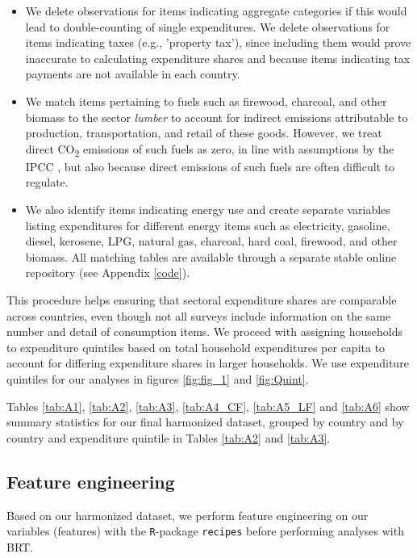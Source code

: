 \documentclass[12pt, a4paper]{article}
\begin{document}
\begin{refsection}
\begin{itemize}
    \item We delete observations for items indicating aggregate categories if this would lead to double-counting of single expenditures. We delete observations for items indicating taxes (e.g., 'property tax'), since including them would prove inaccurate to calculating expenditure shares and because items indicating tax payments are not available in each country.
    \item We match items pertaining to fuels such as firewood, charcoal, and other biomass to the sector \textit{lumber} to account for indirect emissions attributable to production, transportation, and retail of these goods. However, we treat direct CO\textsubscript{2} emissions of such fuels as zero, in line with assumptions by the IPCC \autocite{Grad.2023}, but also because direct emissions of such fuels are often difficult to regulate.
    \item We also identify items indicating energy use and create separate variables listing expenditures for different energy items such as electricity, gasoline, diesel, kerosene, LPG, natural gas, charcoal, hard coal, firewood, and other biomass. All matching tables are available through a separate stable online repository (see Appendix \ref{code}).
\end{itemize}

This procedure helps ensuring that sectoral expenditure shares are comparable across countries, even though not all surveys include information on the same number and detail of consumption items. We proceed with assigning households to expenditure quintiles based on total household expenditures per capita to account for differing expenditure shares in larger households. We use expenditure quintiles for our analyses in figures \ref{fig:fig_1} and \ref{fig:Quint}.

Tables \ref{tab:A1}, \ref{tab:A2}, \ref{tab:A3}, \ref{tab:A4_CF}, \ref{tab:A5_LF} and \ref{tab:A6} show summary statistics for our final harmonized dataset, grouped by country and by country and expenditure quintile in Tables \ref{tab:A2} and \ref{tab:A3}. 


\subsection{Feature engineering} \label{sec:featureengineering}

Based on our harmonized dataset, we perform feature engineering on our variables (features) with the \texttt{R}-package \texttt{recipes} before performing analyses with BRT.


\end{refsection}
\end{document}

